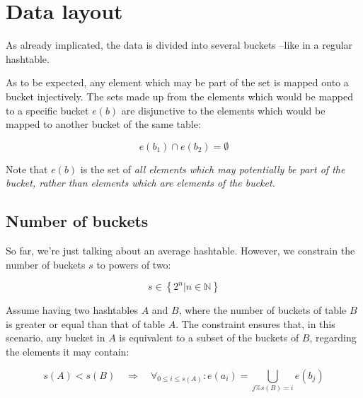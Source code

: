 \section{Data layout}

    As already implicated, the data is divided into several buckets --like in a
    regular hashtable. 

    As to be expected, any element which may be part of the set is mapped onto
    a bucket injectively.
    The sets made up from the elements which would be mapped to a specific
    bucket $e(b)$ are disjunctive to the elements which would be mapped to
    another bucket of the same table:

    \begin{equation}
        e(b_1) \cap e(b_2) = \emptyset
    \end{equation}

    Note that $e(b)$ is the set of \em all\em{} elements which \em may\em{}
    potentially be part of the bucket, rather than elements which \em are\em{}
    elements of the bucket.

    \subsection{Number of buckets}

        So far, we're just talking about an average hashtable. However, we
        constrain the number of buckets $s$ to powers of two:

        \begin{equation}
            s \in \left\{ 2^n | n \in \mathbb{N} \right\}
        \end{equation}

        Assume having two hashtables $A$ and $B$, where the number of buckets of
        table $B$ is greater or equal than that of table $A$.
        The constraint ensures that, in this scenario, any bucket in $A$ is
        equivalent to a subset of the buckets of $B$, regarding the elements it
        may contain:

        \begin{equation}
            s(A) < s(B)
            \quad\Rightarrow\quad
            \forall_{0 \leq i \leq s(A)} : e(a_i) = \bigcup_{j\%s(B)=i} e(b_j)
        \end{equation}


